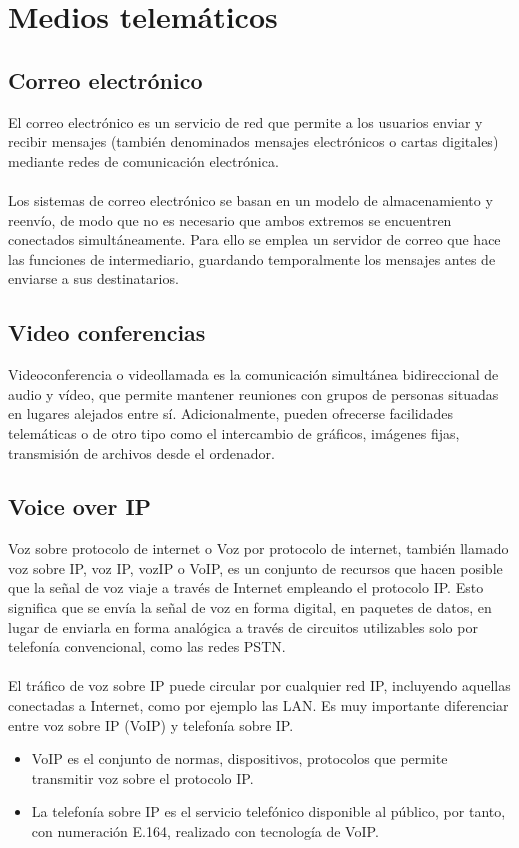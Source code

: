 \documentclass[12pt,letterpaper]{article}
\begin{document}
\newpage
\section{Medios telemáticos}

\subsection{Correo electrónico}
El correo electrónico es un servicio de red que permite a los usuarios enviar y recibir 
mensajes (también denominados mensajes electrónicos o cartas digitales) mediante redes de 
comunicación electrónica.
\\ \\
Los sistemas de correo electrónico se basan en un modelo de almacenamiento y reenvío, de 
modo que no es necesario que ambos extremos se encuentren conectados simultáneamente. 
Para ello se emplea un servidor de correo que hace las funciones de intermediario, guardando 
temporalmente los mensajes antes de enviarse a sus destinatarios. 

\subsection{Video conferencias}
Videoconferencia o videollamada es la comunicación simultánea bidireccional de audio y vídeo, 
que permite mantener reuniones con grupos de personas situadas en lugares alejados entre sí. 
Adicionalmente, pueden ofrecerse facilidades telemáticas o de otro tipo como el intercambio 
de gráficos, imágenes fijas, transmisión de archivos desde el ordenador.

\subsection{Voice over IP}
Voz sobre protocolo de internet o Voz por protocolo de internet, también llamado voz sobre IP, 
voz IP, vozIP o VoIP, es un conjunto de recursos que hacen posible que la señal de voz viaje 
a través de Internet empleando el protocolo IP. Esto significa que se envía la señal de voz 
en forma digital, en paquetes de datos, en lugar de enviarla en forma analógica a través de 
circuitos utilizables solo por telefonía convencional, como las redes PSTN.
\\ \\ 
El tráfico de voz sobre IP puede circular por cualquier red IP, incluyendo aquellas conectadas 
a Internet, como por ejemplo las LAN.
Es muy importante diferenciar entre voz sobre IP (VoIP) y telefonía sobre IP.
\begin{itemize}
    \item VoIP es el conjunto de normas, dispositivos, protocolos que permite transmitir voz sobre el protocolo IP.
    \item La telefonía sobre IP es el servicio telefónico disponible al público, por tanto, con numeración E.164, realizado con tecnología de VoIP.
\end{itemize}
\end{document}
